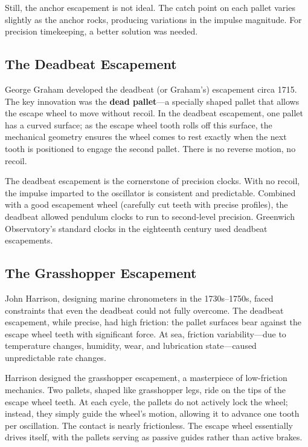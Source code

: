 Still, the anchor escapement is not ideal. The catch point on each pallet varies slightly as the anchor rocks, producing variations in the impulse magnitude. For precision timekeeping, a better solution was needed.

\subsection{The Deadbeat Escapement}

George Graham developed the deadbeat (or Graham's) escapement circa 1715. The key innovation was the \textbf{dead pallet}—a specially shaped pallet that allows the escape wheel to move without recoil. In the deadbeat escapement, one pallet has a curved surface; as the escape wheel tooth rolls off this surface, the mechanical geometry ensures the wheel comes to rest exactly when the next tooth is positioned to engage the second pallet. There is no reverse motion, no recoil.

The deadbeat escapement is the cornerstone of precision clocks. With no recoil, the impulse imparted to the oscillator is consistent and predictable. Combined with a good escapement wheel (carefully cut teeth with precise profiles), the deadbeat allowed pendulum clocks to run to second-level precision. Greenwich Observatory's standard clocks in the eighteenth century used deadbeat escapements.

\subsection{The Grasshopper Escapement}

John Harrison, designing marine chronometers in the 1730s–1750s, faced constraints that even the deadbeat could not fully overcome. The deadbeat escapement, while precise, had high friction: the pallet surfaces bear against the escape wheel teeth with significant force. At sea, friction variability—due to temperature changes, humidity, wear, and lubrication state—caused unpredictable rate changes.

Harrison designed the grasshopper escapement, a masterpiece of low-friction mechanics. Two pallets, shaped like grasshopper legs, ride on the tips of the escape wheel teeth. At each cycle, the pallets do not actively lock the wheel; instead, they simply guide the wheel's motion, allowing it to advance one tooth per oscillation. The contact is nearly frictionless. The escape wheel essentially drives itself, with the pallets serving as passive guides rather than active brakes.

